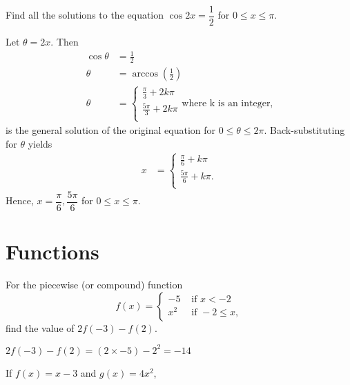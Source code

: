 \documentclass[12pt,addpoints,noanswers]{exam}
\begin{document}
\begin{questions}
\question Find all the solutions to the equation 
$\cos 2x = \dfrac{1}{2} $ for $0\leq x \leq \pi$.
\begin{solution}[2in]
Let $\theta=2x$.
Then
\begin{align*}
\cos\theta &= \frac{1}{2}\\
\theta &= \arccos\left( \frac{1}{2} \right)\\
\theta &= \begin{cases}
\frac{\pi}{3} + 2k\pi\\
\frac{5\pi}{3} + 2k\pi \\
\end{cases}\text{where k is an integer,}
\end{align*} 
is the general solution of the original equation for  $0\leq \theta \leq 2\pi$. Back-substituting for $\theta$ yields
\begin{align*}
x &= \begin{cases}
\frac{\pi}{6} + k\pi \\
\frac{5\pi}{6} + k\pi. \\
\end{cases}
\end{align*}
Hence, $x= \dfrac{\pi}{6}, \dfrac{5\pi}{6}$  for $0\leq x \leq \pi$.
\end{solution}



\section*{Functions}
\question For the piecewise (or compound) function 
\[ f(x) =
\begin{cases}
-5 &\text{ if } x < -2 \\
x^2 &\text{ if } -2 \leq x,
\end{cases} \]
find the value of $ 2f(-3) - f(2) $.
\begin{solution}[1in]
$ 2f(-3) - f(2)
= (2\times-5)-2^2
=-14$
\end{solution}


\question If $ f(x) = x-3 $ and $ g(x)= 4x^2 $,
\begin{parts}

\end{parts}
\end{questions}
\end{document}
